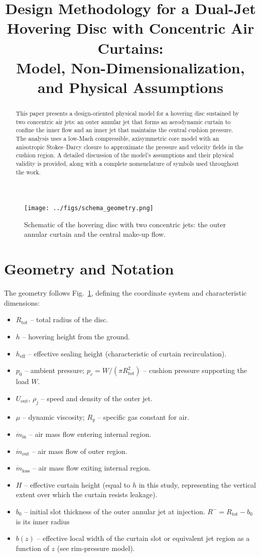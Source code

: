 \documentclass[11pt,a4paper]{article}
\title{Design Methodology for a Dual-Jet Hovering Disc with Concentric Air Curtains:\\
Model, Non-Dimensionalization, and Physical Assumptions}
\author{ }
\date{ }
\begin{document}
\maketitle

\begin{abstract}
This paper presents a design-oriented physical model for a hovering disc sustained by two concentric air jets:
an outer annular jet that forms an aerodynamic curtain to confine the inner flow and an inner jet that maintains the central cushion pressure.
The analysis uses a low-Mach compressible, axisymmetric core model with an anisotropic Stokes--Darcy closure to approximate the pressure and velocity fields in the cushion region.
A detailed discussion of the model's assumptions and their physical validity is provided, along with a complete nomenclature of symbols used throughout the work.
\end{abstract}

\begin{figure}[t]
  \centering
  \texttt{[image: ../figs/schema\_geometry.png]}
  \caption{Schematic of the hovering disc with two concentric jets: the outer annular curtain and the central make-up flow.}
  \label{fig:geometry}
\end{figure}

\section{Geometry and Notation}
\label{sec:geometry}
The geometry follows Fig.~\ref{fig:geometry}, defining the coordinate system and characteristic dimensions:
\begin{itemize}
  \item $R_{\mathrm{tot}}$ -- total radius of the disc.
  \item $h$ -- hovering height from the ground.
  \item $h_{\mathrm{eff}}$ -- effective sealing height (characteristic of curtain recirculation).
  \item $p_0$ -- ambient pressure; $p_c=W/(\pi R_{\mathrm{tot}}^2)$ -- cushion pressure supporting the load $W$.
  \item $U_{\mathrm{out}}$, $\rho_j$ -- speed and density of the outer jet.
  \item $\mu$ -- dynamic viscosity; $R_g$ -- specific gas constant for air.
  \item $\dot{m}_{\mathrm{in}}$ -- air mass flow entering internal region.
  \item $\dot{m}_{\mathrm{out}}$ -- air mass flow of outer region.
  \item $\dot{m}_{\mathrm{loss}}$ -- air mass flow exiting internal region.
  \item $H$ -- effective curtain height (equal to $h$ in this study, representing the vertical extent over which the curtain resists leakage).
  \item $b_0$ -- initial slot thickness of the outer annular jet at injection. $R^{-}=R_{\mathrm{tot}}-b_0$ is its inner radius
  \item $b(z)$ -- effective local width of the curtain slot or equivalent jet region as a function of $z$ (see rim-pressure model).
\end{itemize}
\end{document}
